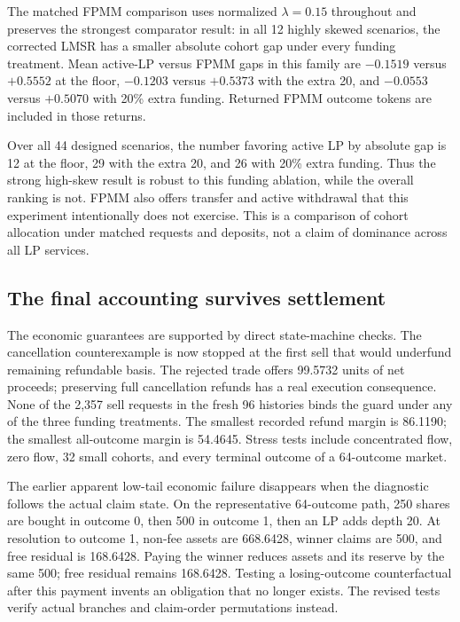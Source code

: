 \documentclass[10pt]{article}
\begin{document}
The matched FPMM comparison uses normalized $\lambda=0.15$ throughout and preserves the strongest comparator result: in all 12 highly skewed scenarios, the corrected LMSR has a smaller absolute cohort gap under every funding treatment. Mean active-LP versus FPMM gaps in this family are $-0.1519$ versus $+0.5552$ at the floor, $-0.1203$ versus $+0.5373$ with the extra 20, and $-0.0553$ versus $+0.5070$ with 20\% extra funding. Returned FPMM outcome tokens are included in those returns.

Over all 44 designed scenarios, the number favoring active LP by absolute gap is 12 at the floor, 29 with the extra 20, and 26 with 20\% extra funding. Thus the strong high-skew result is robust to this funding ablation, while the overall ranking is not. FPMM also offers transfer and active withdrawal that this experiment intentionally does not exercise. This is a comparison of cohort allocation under matched requests and deposits, not a claim of dominance across all LP services.

\subsection{The final accounting survives settlement}

The economic guarantees are supported by direct state-machine checks. The cancellation counterexample is now stopped at the first sell that would underfund remaining refundable basis. The rejected trade offers 99.5732 units of net proceeds; preserving full cancellation refunds has a real execution consequence. None of the 2,357 sell requests in the fresh 96 histories binds the guard under any of the three funding treatments. The smallest recorded refund margin is 86.1190; the smallest all-outcome margin is 54.4645. Stress tests include concentrated flow, zero flow, 32 small cohorts, and every terminal outcome of a 64-outcome market.

The earlier apparent low-tail economic failure disappears when the diagnostic follows the actual claim state. On the representative 64-outcome path, 250 shares are bought in outcome 0, then 500 in outcome 1, then an LP adds depth 20. At resolution to outcome 1, non-fee assets are 668.6428, winner claims are 500, and free residual is 168.6428. Paying the winner reduces assets and its reserve by the same 500; free residual remains 168.6428. Testing a losing-outcome counterfactual after this payment invents an obligation that no longer exists. The revised tests verify actual branches and claim-order permutations instead.
\end{document}
